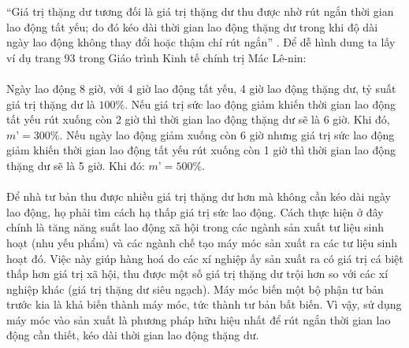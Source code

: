 “Giá trị thặng dư tương đối là giá trị thặng dư thu được nhờ rút ngắn thời gian lao động tất yếu; do đó kéo dài thời gian lao động thặng dư trong khi độ dài ngày lao động không thay đổi hoặc thậm chí rút ngắn” \cite[trang 92]{gt}. Để dễ hình dung ta lấy ví dụ trang 93 trong Giáo trình Kinh tế chính trị Mác Lê-nin:\\\\
Ngày lao động 8 giờ, với 4 giờ lao động tất yếu, 4 giờ lao động thặng dư, tỷ suất giá trị thặng dư là $100\%$. Nếu giá trị sức lao động giảm khiến thời gian lao động tất yếu rút xuống còn 2 giờ thì thời gian lao động thặng dư sẽ là 6 giờ. Khi đó, $m’ = 300\%$. Nếu ngày lao động giảm xuống còn 6 giờ nhưng giá trị sức lao động giảm khiến thời gian lao động tất yếu rút xuống còn 1 giờ thì thời gian lao động thặng dư sẽ là 5 giờ. Khi đó: $m’ = 500\%$.\\\\
Để nhà tư bản thu được nhiều giá trị thặng dư hơn mà không cần kéo dài ngày lao động, họ phải tìm cách hạ thấp giá trị sức lao động. Cách thực hiện ở đây chính là tăng năng suất lao động xã hội trong các ngành sản xuất tư liệu sinh hoạt (nhu yếu phẩm) và các ngành chế tạo máy móc sản xuất ra các tư liệu sinh hoạt đó. Việc này giúp hàng hoá do các xí nghiệp ấy sản xuất ra có giá trị cá biệt thấp hơn giá trị xã hội, thu được một số giá trị thặng dư trội hơn so với các xí nghiệp khác (giá trị thặng dư siêu ngạch). Máy móc biến một bộ phận tư bản trước kia là khả biến thành máy móc, tức thành tư bản bất biến. Vì vậy, sử dụng máy móc vào sản xuất là phương pháp hữu hiệu nhất để rút ngắn thời gian lao động cần thiết, kéo dài thời gian lao động thặng dư.
